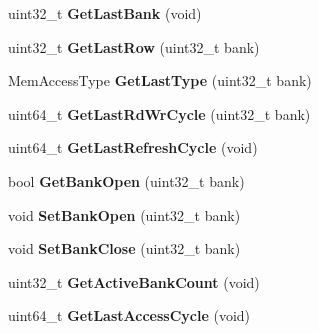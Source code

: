 \begin{DoxyCompactItemize}
\item 
\hypertarget{classMemRankBase_accf69f66b82d81fcccc82c4fe20aa510}{uint32\-\_\-t {\bfseries Get\-Last\-Bank} (void)}\label{classMemRankBase_accf69f66b82d81fcccc82c4fe20aa510}

\item 
\hypertarget{classMemRankBase_a6f58b7856b52d6d711b8904e05e299fc}{uint32\-\_\-t {\bfseries Get\-Last\-Row} (uint32\-\_\-t bank)}\label{classMemRankBase_a6f58b7856b52d6d711b8904e05e299fc}

\item 
\hypertarget{classMemRankBase_ade57246375526c06def01af6a2273c3e}{Mem\-Access\-Type {\bfseries Get\-Last\-Type} (uint32\-\_\-t bank)}\label{classMemRankBase_ade57246375526c06def01af6a2273c3e}

\item 
\hypertarget{classMemRankBase_a2da4b2db453b09821f4ba51f8e0d29f4}{uint64\-\_\-t {\bfseries Get\-Last\-Rd\-Wr\-Cycle} (uint32\-\_\-t bank)}\label{classMemRankBase_a2da4b2db453b09821f4ba51f8e0d29f4}

\item 
\hypertarget{classMemRankBase_a53c7056c8456da311f8569353564c69f}{uint64\-\_\-t {\bfseries Get\-Last\-Refresh\-Cycle} (void)}\label{classMemRankBase_a53c7056c8456da311f8569353564c69f}

\item 
\hypertarget{classMemRankBase_a523c401cf2c2a3a005276cc6c2517706}{bool {\bfseries Get\-Bank\-Open} (uint32\-\_\-t bank)}\label{classMemRankBase_a523c401cf2c2a3a005276cc6c2517706}

\item 
\hypertarget{classMemRankBase_a273428848d725f6f7abecf02133597b6}{void {\bfseries Set\-Bank\-Open} (uint32\-\_\-t bank)}\label{classMemRankBase_a273428848d725f6f7abecf02133597b6}

\item 
\hypertarget{classMemRankBase_aa57f8d92c27b9a4ffca22b5f869160b6}{void {\bfseries Set\-Bank\-Close} (uint32\-\_\-t bank)}\label{classMemRankBase_aa57f8d92c27b9a4ffca22b5f869160b6}

\item 
\hypertarget{classMemRankBase_a56e8e7710a4cbbde65e6c84165e6dd2d}{uint32\-\_\-t {\bfseries Get\-Active\-Bank\-Count} (void)}\label{classMemRankBase_a56e8e7710a4cbbde65e6c84165e6dd2d}

\item 
\hypertarget{classMemRankBase_aaae3776b41abb250ee72feb4077ad250}{uint64\-\_\-t {\bfseries Get\-Last\-Access\-Cycle} (void)}\label{classMemRankBase_aaae3776b41abb250ee72feb4077ad250}


\end{DoxyCompactItemize}
